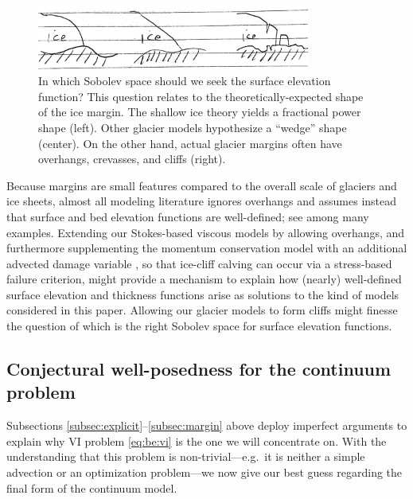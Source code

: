 \documentclass[hidelinks,onefignum,onetabnum,final]{siamart220329}  %
\begin{document}
\begin{figure}
\begin{center}
\includegraphics[width=0.8\textwidth]{figs/margins.jpg}
\end{center}
\caption{In which Sobolev space should we seek the surface elevation function?  This question relates to the theoretically-expected shape of the ice margin.  The shallow ice theory yields a fractional power shape (left).  Other glacier models hypothesize a ``wedge'' shape (center).  On the other hand, actual glacier margins often have overhangs, crevasses, and cliffs (right).} %
\label{fig:margins}
\end{figure}

Because margins are small features compared to the overall scale of glaciers and ice sheets, almost all modeling literature ignores overhangs and assumes instead that surface and bed elevation functions are well-defined; see \cite{IsaacStadlerGhattas2015,Jouvetetal2008,LofgrenAhlkronaHelanow2022,WirbelJarosch2020} among many examples.  Extending our Stokes-based viscous models by allowing overhangs, and furthermore supplementing the momentum conservation model with an additional advected damage variable \cite{PralongFunk2005}, so that ice-cliff calving can occur via a stress-based failure criterion, might provide a mechanism to explain how (nearly) well-defined surface elevation and thickness functions arise as solutions to the kind of models considered in this paper.  Allowing our glacier models to form cliffs might finesse the question of which is the right Sobolev space for surface elevation functions.

\subsection{Conjectural well-posedness for the continuum problem} \label{subsec:conjecture} Subsections \ref{subsec:explicit}--\ref{subsec:margin} above deploy imperfect arguments to explain why VI problem \eqref{eq:be:vi} is the one we will concentrate on.  With the understanding that this problem is non-trivial---e.g.~it is neither a simple advection or an optimization problem---we now give our best guess regarding the final form of the continuum model.
\end{document}
